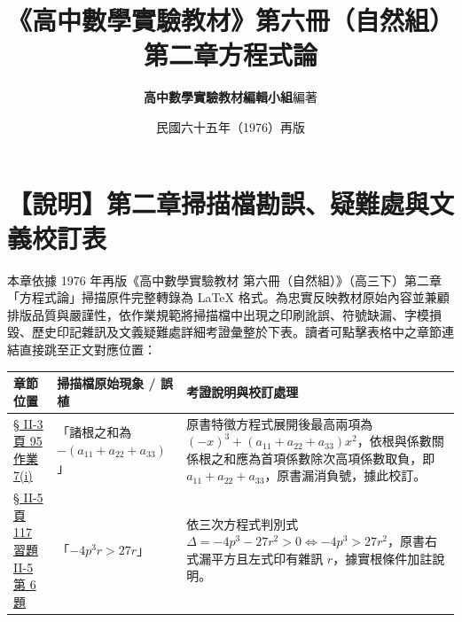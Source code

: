 \documentclass[a4paper,12pt,twoside]{article}
\title{\LARGE\textbf{《高中數學實驗教材》第六冊（自然組）}\\[0.5em] \Large\textbf{第二章\quad 方程式論}}
\author{\textbf{高中數學實驗教材編輯小組}\quad 編著}
\date{民國六十五年（1976）再版}
\begin{document}
\maketitle
\thispagestyle{firstpage}

\section*{【說明】第二章掃描檔勘誤、疑難處與文義校訂表}
\label{sec:errata_notes_b6_ch2}
\label{sec:current_errata}

本章依據 1976 年再版《高中數學實驗教材 第六冊（自然組）》（高三下）第二章「方程式論」掃描原件完整轉錄為 \LaTeX{} 格式。為忠實反映教材原始內容並兼顧排版品質與嚴謹性，依作業規範將掃描檔中出現之印刷訛誤、符號缺漏、字模損毀、歷史印記雜訊及文義疑難處詳細考證彙整於下表。讀者可點擊表格中之章節連結直接跳至正文對應位置：

\begin{table}[H]
\centering
\small
\renewcommand{\arraystretch}{1.35}
\begin{tabularx}{\textwidth}{|p{3.2cm}|p{3.8cm}|X|}
\hline
\textbf{章節位置} & \textbf{掃描檔原始現象 / 誤植} & \textbf{考證說明與校訂處理} \\ \hline

\hyperref[note:b6-ch2-p95-trace]{§ II-3 頁 95 作業 7(i)} & 
「諸根之和為 $-(a_{11}+a_{22}+a_{33})$」 & 
原書特徵方程式展開後最高兩項為 $(-x)^3 + (a_{11}+a_{22}+a_{33})x^2$，依根與係數關係根之和應為首項係數除次高項係數取負，即 $a_{11}+a_{22}+a_{33}$，原書漏消負號，據此校訂。 \\ \hline

\hyperref[note:b6-ch2-p117-cubic-ineq]{§ II-5 頁 117 習題 II-5 第 6 題} & 
「$-4p^3r > 27r$」 & 
依三次方程式判別式 $\Delta = -4p^3 - 27r^2 > 0 \iff -4p^3 > 27r^2$，原書右式漏平方且左式印有雜訊 $r$，據實根條件加註說明。 \\ \hline

\end{tabularx}
\end{table}

\newpage
\renewcommand{\contentsname}{目\qquad 次}
\tableofcontents
\newpage

\setcounter{section}{1}

\end{document}
